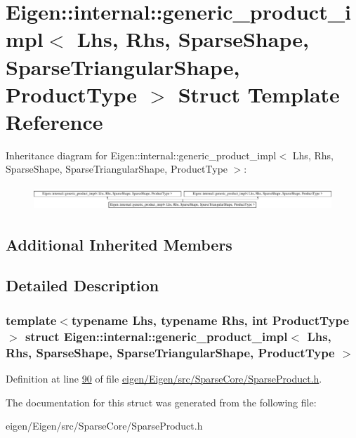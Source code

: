 \hypertarget{struct_eigen_1_1internal_1_1generic__product__impl_3_01_lhs_00_01_rhs_00_01_sparse_shape_00_01_s05ccb218a557b35cabc12ad35cb16218}{}\section{Eigen\+:\+:internal\+:\+:generic\+\_\+product\+\_\+impl$<$ Lhs, Rhs, Sparse\+Shape, Sparse\+Triangular\+Shape, Product\+Type $>$ Struct Template Reference}
\label{struct_eigen_1_1internal_1_1generic__product__impl_3_01_lhs_00_01_rhs_00_01_sparse_shape_00_01_s05ccb218a557b35cabc12ad35cb16218}
Inheritance diagram for Eigen\+:\+:internal\+:\+:generic\+\_\+product\+\_\+impl$<$ Lhs, Rhs, Sparse\+Shape, Sparse\+Triangular\+Shape, Product\+Type $>$\+:\begin{figure}[H]
\begin{center}
\leavevmode
\includegraphics[height=0.916530cm]{struct_eigen_1_1internal_1_1generic__product__impl_3_01_lhs_00_01_rhs_00_01_sparse_shape_00_01_s05ccb218a557b35cabc12ad35cb16218}
\end{center}
\end{figure}
\subsection*{Additional Inherited Members}


\subsection{Detailed Description}
\subsubsection*{template$<$typename Lhs, typename Rhs, int Product\+Type$>$\newline
struct Eigen\+::internal\+::generic\+\_\+product\+\_\+impl$<$ Lhs, Rhs, Sparse\+Shape, Sparse\+Triangular\+Shape, Product\+Type $>$}



Definition at line \hyperlink{eigen_2_eigen_2src_2_sparse_core_2_sparse_product_8h_source_l00090}{90} of file \hyperlink{eigen_2_eigen_2src_2_sparse_core_2_sparse_product_8h_source}{eigen/\+Eigen/src/\+Sparse\+Core/\+Sparse\+Product.\+h}.



The documentation for this struct was generated from the following file\+:\begin{DoxyCompactItemize}
\item 
eigen/\+Eigen/src/\+Sparse\+Core/\+Sparse\+Product.\+h\end{DoxyCompactItemize}
